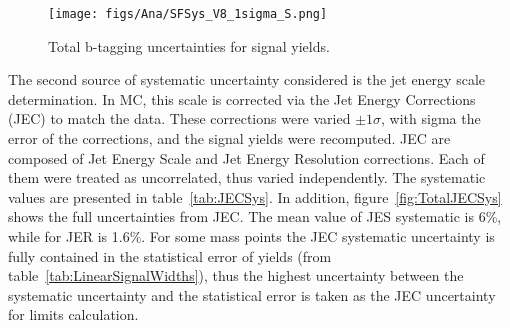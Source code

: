 \begin{figure}[!Hhtbp]
  \begin{center}
    \texttt{[image: figs/Ana/SFSys\_V8\_1sigma\_S.png]}
    \caption{Total b-tagging uncertainties for signal yields.}
    \label{fig:TotalSFSys}
  \end{center}
\end{figure}

The second source of systematic uncertainty considered is the jet energy scale determination. In MC, this scale is corrected via the Jet Energy Corrections (JEC) to match the data. These corrections were varied $\pm 1\sigma$, with sigma the error of the corrections, and the signal yields were recomputed. JEC are composed of Jet Energy Scale and Jet Energy Resolution corrections. Each of them were treated as uncorrelated, thus varied independently. The systematic values are presented in table~\ref{tab:JECSys}. In addition, figure~\ref{fig:TotalJECSys} shows the full uncertainties from JEC. The mean value of JES systematic is 6\%, while for JER is 1.6\%. For some mass points the JEC systematic uncertainty is fully contained in the statistical error of yields (from table~\ref{tab:LinearSignalWidths}), thus the highest uncertainty between the systematic uncertainty and the statistical error is taken as the JEC uncertainty for limits calculation.

\begin{table*}[htbH]
\begin{center}
\caption{JEC uncertainties for signal yields.\label{tab:JECSys}}
\end{center}
\end{table*}

